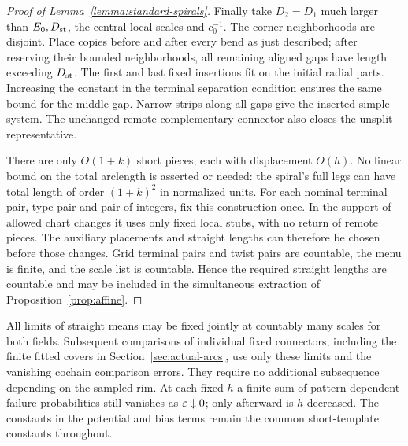 \begin{proof}[Proof of Lemma~\ref{lemma:standard-spirals}]
Finally take $D_2=D_1$ much larger than $E_0,D_{\rm st}$, the central
local scales and $c_0^{-1}$.  The corner neighborhoods are disjoint.
Place copies before and after every bend as just described; after
reserving their bounded neighborhoods, all remaining aligned gaps have
length exceeding $D_{\rm st}$.  The first and last fixed insertions fit
on the initial radial parts.  Increasing the constant in the terminal
separation condition ensures the same bound for the middle gap.  Narrow
strips along all gaps give the inserted simple system.  The unchanged
remote complementary connector also closes the unsplit representative.

There are only $O(1+k)$ short pieces, each with displacement $O(h)$.
No linear bound on the total arclength is asserted or needed: the
spiral's full legs can have total length of order $(1+k)^2$ in normalized
units.  For each nominal terminal pair, type pair and pair of integers,
fix this construction once.  In the support of allowed chart changes it
uses only fixed local stubs, with no return of remote pieces.  The
auxiliary placements and straight lengths can therefore be chosen
before those changes.  Grid terminal pairs and twist pairs are
countable, the menu is finite, and the scale list is countable.
Hence the required straight lengths are countable and may be included
in the simultaneous extraction of Proposition~\ref{prop:affine}.
\end{proof}

All limits of straight means may be fixed jointly at countably many
scales for both fields.  Subsequent comparisons of individual fixed
connectors, including the finite fitted covers in
Section~\ref{sec:actual-arcs}, use only these limits and the vanishing
cochain comparison errors.  They require no additional subsequence
depending on the sampled rim.  At each fixed $h$ a finite sum of
pattern-dependent failure probabilities still vanishes as
$\varepsilon\downarrow0$; only afterward is $h$ decreased.  The constants in
the potential and bias terms remain the common short-template constants
throughout.
